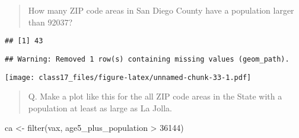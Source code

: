 \documentclass[
]{article}
\newenvironment{Shaded}{\begin{snugshade}}{\end{snugshade}}
\newcommand{\AttributeTok}[1]{\textcolor[rgb]{0.77,0.63,0.00}{#1}}
\newcommand{\DecValTok}[1]{\textcolor[rgb]{0.00,0.00,0.81}{#1}}
\newcommand{\FloatTok}[1]{\textcolor[rgb]{0.00,0.00,0.81}{#1}}
\newcommand{\FunctionTok}[1]{\textcolor[rgb]{0.00,0.00,0.00}{#1}}
\newcommand{\NormalTok}[1]{#1}
\newcommand{\OtherTok}[1]{\textcolor[rgb]{0.56,0.35,0.01}{#1}}
\newcommand{\SpecialCharTok}[1]{\textcolor[rgb]{0.00,0.00,0.00}{#1}}
\newcommand{\StringTok}[1]{\textcolor[rgb]{0.31,0.60,0.02}{#1}}
\begin{document}
\begin{quote}
How many ZIP code areas in San Diego County have a population larger
than 92037?
\end{quote}

\begin{Shaded}
\end{Shaded}

\begin{verbatim}
## [1] 43
\end{verbatim}

\begin{Shaded}
\end{Shaded}

\begin{verbatim}
## Warning: Removed 1 row(s) containing missing values (geom_path).
\end{verbatim}

\texttt{[image: class17\_files/figure-latex/unnamed-chunk-33-1.pdf]}

\begin{quote}
Q. Make a plot like this for the all ZIP code areas in the State with a
population at least as large as La Jolla.
\end{quote}

\begin{Shaded}
\begin{Highlighting}[]
\NormalTok{ca }\OtherTok{\textless{}{-}} \FunctionTok{filter}\NormalTok{(vax, age5\_plus\_population }\SpecialCharTok{\textgreater{}} \DecValTok{36144}\NormalTok{)}
\end{Highlighting}
\end{Shaded}
\end{document}
